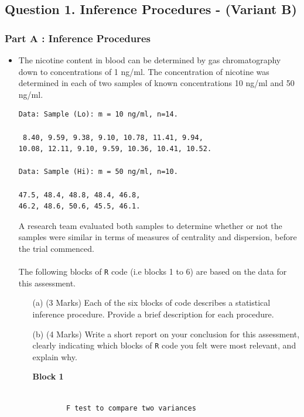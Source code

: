 \documentclass[a4paper,12pt]{article}
\begin{document}
\subsection*{Question 1. Inference Procedures - (Variant B) }
\subsubsection*{Part A : Inference Procedures}
\begin{itemize}
\item The nicotine content in blood can be determined by gas chromatography down to concentrations of 1 ng/ml. The concentration of nicotine was determined in each of two samples of known concentrations 10 ng/ml and 50 ng/ml.
\begin{framed}
\begin{verbatim}
Data: Sample (Lo): m = 10 ng/ml, n=14.

 8.40, 9.59, 9.38, 9.10, 10.78, 11.41, 9.94, 
10.08, 12.11, 9.10, 9.59, 10.36, 10.41, 10.52.

Data: Sample (Hi): m = 50 ng/ml, n=10.

47.5, 48.4, 48.8, 48.4, 46.8, 
46.2, 48.6, 50.6, 45.5, 46.1.
\end{verbatim}
\end{framed}
A research team evaluated both samples to determine whether or not the samples were similar in terms of measures of centrality and dispersion, before the trial commenced.  \\  \\ The following blocks of \texttt{R} code (i.e blocks 1 to 6) are based on the data for this assessment. \\ 
\begin{itemize}
\item[(a)] (3 Marks) Each of the six blocks of code describes a statistical inference procedure. Provide a brief description for each procedure.
\item[(b)] (4 Marks) Write a short report on your conclusion for this assessment, clearly indicating which blocks of \texttt{R} code you felt were most relevant, and explain why. 
\end{itemize}

\begin{itemize}
\item[\textbf{Block 1}]
\begin{framed}
\begin{verbatim}

        F test to compare two variances


\end{verbatim}
\end{framed}
\end{itemize}
\end{itemize}
\end{document}
